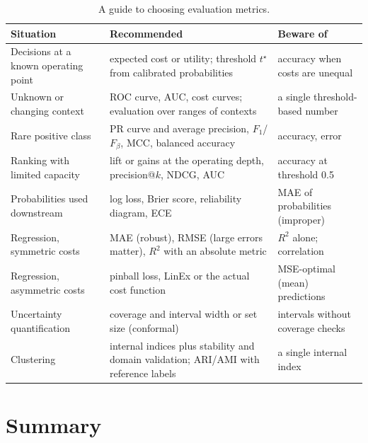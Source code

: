 \begin{table}[htbp]
\centering\small
\caption{A guide to choosing evaluation metrics.}\label{tab:choosing}
\begin{tabularx}{\textwidth}{@{}>{\raggedright\arraybackslash}p{3.7cm}>{\raggedright\arraybackslash}X>{\raggedright\arraybackslash}p{3.2cm}@{}}
\toprule
Situation & Recommended & Beware of\\
\midrule
Decisions at a known operating point & expected cost or utility; threshold $t^\star$ from calibrated probabilities & accuracy when costs are unequal\\
Unknown or changing context & ROC curve, AUC, cost curves; evaluation over ranges of contexts & a single threshold-based number\\
Rare positive class & PR curve and average precision, $F_1$/$F_\beta$, MCC, balanced accuracy & accuracy, error\\
Ranking with limited capacity & lift or gains at the operating depth, precision@$k$, NDCG, AUC & accuracy at threshold 0.5\\
Probabilities used downstream & log loss, Brier score, reliability diagram, ECE & MAE of probabilities (improper)\\
Regression, symmetric costs & MAE (robust), RMSE (large errors matter), $R^2$ with an absolute metric & $R^2$ alone; correlation\\
Regression, asymmetric costs & pinball loss, LinEx or the actual cost function & MSE-optimal (mean) predictions\\
Uncertainty quantification & coverage and interval width or set size (conformal) & intervals without coverage checks\\
Clustering & internal indices plus stability and domain validation; ARI/AMI with reference labels & a single internal index\\
\bottomrule
\end{tabularx}
\end{table}

\section{Summary}\label{sec:summary}

